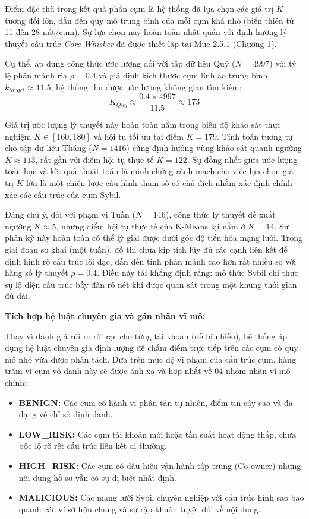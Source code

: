 \indent\indent Điểm đặc thù trong kết quả phân cụm là hệ thống đã lựa chọn các giá trị $K$ tương đối lớn, dẫn đến quy mô trung bình của mỗi cụm khá nhỏ (biến thiên từ 11 đến 28 nút/cụm). Sự lựa chọn này hoàn toàn nhất quán với định hướng lý thuyết cấu trúc \textit{Core-Whisker} đã được thiết lập tại Mục 2.5.1 (Chương 1).\vspace{0.3cm}

Cụ thể, áp dụng công thức ước lượng đối với tập dữ liệu Quý ($N=4997$) với tỷ lệ phân mảnh rìa $\rho = 0.4$ và giả định kích thước cụm lính ảo trung bình $k_{target} \approx 11.5$, hệ thống thu được ước lượng không gian tìm kiếm:
\[
    K_{Quy} \approx \frac{0.4 \times 4997}{11.5} \approx 173
\]

Giá trị ước lượng lý thuyết này hoàn toàn nằm trong biên độ khảo sát thực nghiệm $K \in [160, 180]$ và hội tụ tối ưu tại điểm $K=179$. Tính toán tương tự cho tập dữ liệu Tháng ($N=1416$) cũng định hướng vùng khảo sát quanh ngưỡng $K \approx 113$, rất gần với điểm hội tụ thực tế $K=122$. Sự đồng nhất giữa ước lượng toán học và kết quả thuật toán là minh chứng rành mạch cho việc lựa chọn giá trị $K$ lớn là một chiến lược cấu hình tham số có chủ đích nhằm xác định chính xác các cấu trúc của cụm Sybil.\vspace{0.3cm}

Đáng chú ý, đối với phạm vi Tuần ($N=146$), công thức lý thuyết đề xuất ngưỡng $K \approx 5$, nhưng điểm hội tụ thực tế của K-Means lại nằm ở $K=14$. Sự phân kỳ này hoàn toàn có thể lý giải được dưới góc độ tiến hóa mạng lưới. Trong giai đoạn sơ khai (một tuần), đồ thị chưa kịp tích lũy đủ các cạnh liên kết để định hình rõ cấu trúc lõi đặc, dẫn đến tính phân mảnh cao hơn rất nhiều so với hằng số lý thuyết $\rho = 0.4$. Điều này tái khẳng định rằng: mô thức Sybil chỉ thực sự lộ diện cấu trúc bầy đàn rõ nét khi được quan sát trong một khung thời gian đủ dài.\vspace{0.3cm}

\textbf{Tích hợp hệ luật chuyên gia và gán nhãn vĩ mô:}\vspace{0.2cm}

Thay vì đánh giá rủi ro rời rạc cho từng tài khoản (dễ bị nhiễu), hệ thống áp dụng hệ luật chuyên gia định lượng để chấm điểm trực tiếp trên các cụm có quy mô nhỏ vừa được phân tách. Dựa trên mức độ vi phạm của cấu trúc cụm, hàng trăm vi cụm vô danh này sẽ được ánh xạ và hợp nhất về 04 nhóm nhãn vĩ mô chính:
\begin{itemize}[label={--}, itemsep=1pt]
    \item \textbf{BENIGN:} Các cụm có hành vi phân tán tự nhiên, điểm tin cậy cao và đa dạng về chỉ số định danh.
    \item \textbf{LOW\_RISK:} Các cụm tài khoản mới hoặc tần suất hoạt động thấp, chưa bộc lộ rõ rệt cấu trúc liên kết dị thường.
    \item \textbf{HIGH\_RISK:} Các cụm có dấu hiệu vận hành tập trung (Co-owner) nhưng nội dung hồ sơ vẫn có sự dị biệt nhất định.
    \item \textbf{MALICIOUS:} Các mạng lưới Sybil chuyên nghiệp với cấu trúc hình sao bao quanh các ví sở hữu chung và sự rập khuôn tuyệt đối về nội dung.
\end{itemize}

